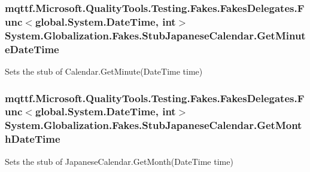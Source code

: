 \hypertarget{class_system_1_1_globalization_1_1_fakes_1_1_stub_japanese_calendar_a6df1bc5f2e5ba5b855885ed08cf9ea52}{
\subsubsection[{Get\-Minute\-Date\-Time}]{\setlength{\rightskip}{0pt plus 5cm}mqttf.\-Microsoft.\-Quality\-Tools.\-Testing.\-Fakes.\-Fakes\-Delegates.\-Func$<$global.\-System.\-Date\-Time, int$>$ System.\-Globalization.\-Fakes.\-Stub\-Japanese\-Calendar.\-Get\-Minute\-Date\-Time}}\label{class_system_1_1_globalization_1_1_fakes_1_1_stub_japanese_calendar_a6df1bc5f2e5ba5b855885ed08cf9ea52}


Sets the stub of Calendar.\-Get\-Minute(\-Date\-Time time)

\hypertarget{class_system_1_1_globalization_1_1_fakes_1_1_stub_japanese_calendar_a6df69fe98c7fa31237ab475f6b8d74b8}{
\subsubsection[{Get\-Month\-Date\-Time}]{\setlength{\rightskip}{0pt plus 5cm}mqttf.\-Microsoft.\-Quality\-Tools.\-Testing.\-Fakes.\-Fakes\-Delegates.\-Func$<$global.\-System.\-Date\-Time, int$>$ System.\-Globalization.\-Fakes.\-Stub\-Japanese\-Calendar.\-Get\-Month\-Date\-Time}}\label{class_system_1_1_globalization_1_1_fakes_1_1_stub_japanese_calendar_a6df69fe98c7fa31237ab475f6b8d74b8}


Sets the stub of Japanese\-Calendar.\-Get\-Month(\-Date\-Time time)

